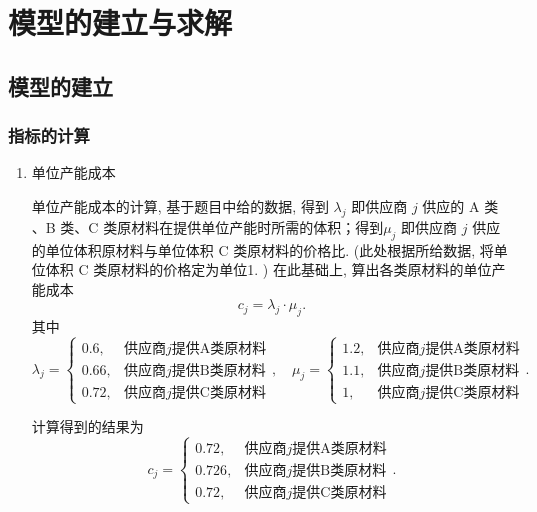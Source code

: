 \documentclass[11pt, fontset = windows]{article}
\begin{document}
\section[]{模型的建立与求解}

\subsection[]{模型的建立}

\subsubsection[]{指标的计算}

\begin{enumerate}

    \item 单位产能成本

          单位产能成本的计算, 基于题目中给的数据, 得到 $\lambda_j$ 即供应商 $j$ 供应的 A 类 、B 类、C 类原材料在提供单位产能时所需的体积；得到$\mu_j$ 即供应商 $j$ 供应的单位体积原材料与单位体积 C 类原材料的价格比.  (此处根据所给数据, 将单位体积 C 类原材料的价格定为单位1. )
          在此基础上, 算出各类原材料的单位产能成本
          \begin{equation}
              c_j=\lambda_j\cdot\mu_j.
          \end{equation}
          其中
          \begin{equation}
              \lambda_{j}=
              \begin{cases}
                  0.6,  & \mbox{供应商$j$提供A类原材料} \\
                  0.66, & \mbox{供应商$j$提供B类原材料} \\
                  0.72, & \mbox{供应商$j$提供C类原材料}
              \end{cases}
              ,\quad
              \mu_{j}=
              \begin{cases}
                  1.2, & \mbox{供应商$j$提供A类原材料} \\
                  1.1, & \mbox{供应商$j$提供B类原材料} \\
                  1,   & \mbox{供应商$j$提供C类原材料}
              \end{cases}.
          \end{equation}

          计算得到的结果为
          \begin{equation}
              c_{j}=
              \begin{cases}
                  0.72,  & \mbox{供应商$j$提供A类原材料} \\
                  0.726, & \mbox{供应商$j$提供B类原材料} \\
                  0.72,  & \mbox{供应商$j$提供C类原材料}
              \end{cases}.
          \end{equation}


\end{enumerate}
\end{document}
